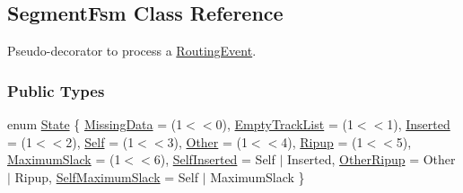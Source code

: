\hypertarget{classKite_1_1SegmentFsm}{}\subsection{Segment\+Fsm Class Reference}
\label{classKite_1_1SegmentFsm}


Pseudo-\/decorator to process a \mbox{\hyperlink{classKite_1_1RoutingEvent}{Routing\+Event}}.  


\subsubsection*{Public Types}
\begin{DoxyCompactItemize}
\item 
enum \mbox{\hyperlink{classKite_1_1SegmentFsm_a5d74787dedbc4e11c1ab15bf487e61f8}{State}} \{ \newline
\mbox{\hyperlink{classKite_1_1SegmentFsm_a5d74787dedbc4e11c1ab15bf487e61f8a79ae4f26b8ed9c55b81f981bb5076e1d}{Missing\+Data}} = (1$<$$<$0), 
\newline
\mbox{\hyperlink{classKite_1_1SegmentFsm_a5d74787dedbc4e11c1ab15bf487e61f8a13ac7e0722ca806ff25d8fa9220e980b}{Empty\+Track\+List}} = (1$<$$<$1), 
\newline
\mbox{\hyperlink{classKite_1_1SegmentFsm_a5d74787dedbc4e11c1ab15bf487e61f8abb9adb1672565a2d0c2de07ea840414e}{Inserted}} = (1$<$$<$2), 
\newline
\mbox{\hyperlink{classKite_1_1SegmentFsm_a5d74787dedbc4e11c1ab15bf487e61f8aacd3ef9d889b306ca7e7bdcd37ba659a}{Self}} = (1$<$$<$3), 
\newline
\mbox{\hyperlink{classKite_1_1SegmentFsm_a5d74787dedbc4e11c1ab15bf487e61f8a75f0c3176be2226dfe8ad164a0a034a2}{Other}} = (1$<$$<$4), 
\newline
\mbox{\hyperlink{classKite_1_1SegmentFsm_a5d74787dedbc4e11c1ab15bf487e61f8a08900dc237aef7e4a7f50d2ba1ffd748}{Ripup}} = (1$<$$<$5), 
\newline
\mbox{\hyperlink{classKite_1_1SegmentFsm_a5d74787dedbc4e11c1ab15bf487e61f8a9fc7197613f3435d906edf69a73acf38}{Maximum\+Slack}} = (1$<$$<$6), 
\newline
\mbox{\hyperlink{classKite_1_1SegmentFsm_a5d74787dedbc4e11c1ab15bf487e61f8a8c564779c81599aaadbe879fa2b08d92}{Self\+Inserted}} = Self $\vert$ Inserted, 
\newline
\mbox{\hyperlink{classKite_1_1SegmentFsm_a5d74787dedbc4e11c1ab15bf487e61f8a22374bab829fac7d12af4784d80eeb6e}{Other\+Ripup}} = Other $\vert$ Ripup, 
\newline
\mbox{\hyperlink{classKite_1_1SegmentFsm_a5d74787dedbc4e11c1ab15bf487e61f8a560766bb79539564fdeda432c8efae6d}{Self\+Maximum\+Slack}} = Self $\vert$ Maximum\+Slack
 \}
\end{DoxyCompactItemize}
